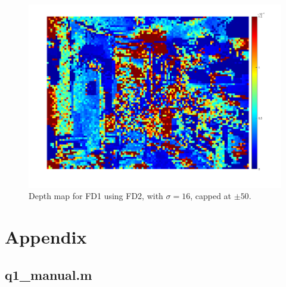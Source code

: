 \documentclass[a4paper, 10pt, conference]{ieeeconf}
\begin{document}
\begin{figure}[!ht]
  \centering
  \includegraphics[width=0.75\linewidth]{pic/q2_2_e_gaussian}
	\caption{Depth map for FD1 using FD2, with $\sigma = 16$, capped at $\pm 50$.}
    \vspace{-0.5cm}
  \label{fig:q2_2_e_gaussian}
\end{figure}






\onecolumn
\section*{Appendix}

\subsection*{q1\_manual.m}

\newpage
\end{document}
